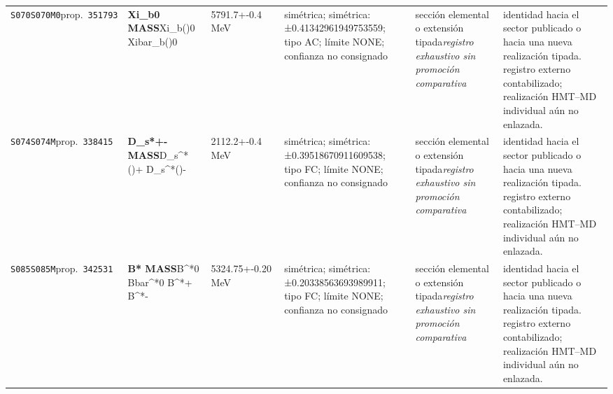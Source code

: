 \begin{landscape}
\begin{longtable}{L{1.85cm}L{4.45cm}L{2.35cm}L{4.05cm}L{3.35cm}L{7.15cm}}
\texttt{S070}\newline \texttt{S070M0}\newline prop.\ \texttt{351793} & \textbf{Xi\_\allowbreak{}b0 MASS}\newline Xi\_\allowbreak{}b()0 \textbar{}\allowbreak{} Xibar\_\allowbreak{}b()0 & 5791.7+-0.4\,MeV & simétrica; simétrica: ±0.41342961949753559; tipo AC; límite NONE; confianza no consignado & sección elemental o extensión tipada\newline \emph{registro exhaustivo sin promoción comparativa} & identidad hacia el sector publicado o hacia una nueva realización tipada. registro externo contabilizado; realización HMT--MD individual aún no enlazada. \\
\texttt{S074}\newline \texttt{S074M}\newline prop.\ \texttt{338415} & \textbf{D\_\allowbreak{}s*+- MASS}\newline D\_\allowbreak{}s\textasciicircum{}*()+ \textbar{}\allowbreak{} D\_\allowbreak{}s\textasciicircum{}*()- & 2112.2+-0.4\,MeV & simétrica; simétrica: ±0.39518670911609538; tipo FC; límite NONE; confianza no consignado & sección elemental o extensión tipada\newline \emph{registro exhaustivo sin promoción comparativa} & identidad hacia el sector publicado o hacia una nueva realización tipada. registro externo contabilizado; realización HMT--MD individual aún no enlazada. \\
\texttt{S085}\newline \texttt{S085M}\newline prop.\ \texttt{342531} & \textbf{B* MASS}\newline B\textasciicircum{}*0 \textbar{}\allowbreak{} Bbar\textasciicircum{}*0 \textbar{}\allowbreak{} B\textasciicircum{}*+ \textbar{}\allowbreak{} B\textasciicircum{}*- & 5324.75+-0.20\,MeV & simétrica; simétrica: ±0.20338563693989911; tipo FC; límite NONE; confianza no consignado & sección elemental o extensión tipada\newline \emph{registro exhaustivo sin promoción comparativa} & identidad hacia el sector publicado o hacia una nueva realización tipada. registro externo contabilizado; realización HMT--MD individual aún no enlazada. \\

\end{longtable}
\end{landscape}
